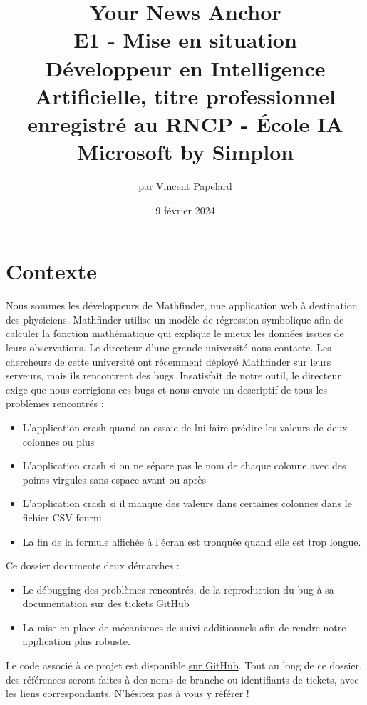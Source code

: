 \documentclass[french]{article}
\title{%
    \huge Your News Anchor  \\
    \bigskip
    \large E1 - Mise en situation \\ 
    Développeur en Intelligence Artificielle,
    titre professionnel enregistré au RNCP - École IA Microsoft by Simplon}
\date{9 février 2024}
\author{par Vincent Papelard}
\begin{document}
    \maketitle
    \newpage
    \newpage

    \section{Contexte}
    Nous sommes les développeurs de Mathfinder, une application web à destination des physiciens. Mathfinder utilise un modèle de régression symbolique afin de calculer la fonction mathématique qui explique le mieux les données issues de leurs observations.
    Le directeur d'une grande université nous contacte. Les chercheurs de cette université ont récemment déployé Mathfinder sur leurs serveurs, mais ils rencontrent des bugs. Insatisfait de notre outil, le directeur exige que nous corrigions ces bugs et nous envoie un descriptif de tous les problèmes rencontrés :
    \begin{itemize}
        \item L'application crash quand on essaie de lui faire prédire les valeurs de deux colonnes ou plus
        \item L'application crash si on ne sépare pas le nom de chaque colonne avec des points-virgules sans espace avant ou après
        \item L'application crash si il manque des valeurs dans certaines colonnes dans le fichier CSV fourni
        \item La fin de la formule affichée à l'écran est tronquée quand elle est trop longue.
    \end{itemize}
    
    Ce dossier documente deux démarches :
    \begin{itemize}
        \item Le débugging des problèmes rencontrés, de la reproduction du bug à sa documentation sur des tickets GitHub
        \item La mise en place de mécanismes de suivi additionnels afin de rendre notre application plus robuste.
    \end{itemize}
    Le code associé à ce projet est disponible \href{https://github.com/vinpap/mathfinder}{sur GitHub}. Tout au long de ce dossier, des références seront faites à des noms de branche ou identifiants de tickets, avec les liens correspondants. N'hésitez pas à vous y référer !
\end{document}
